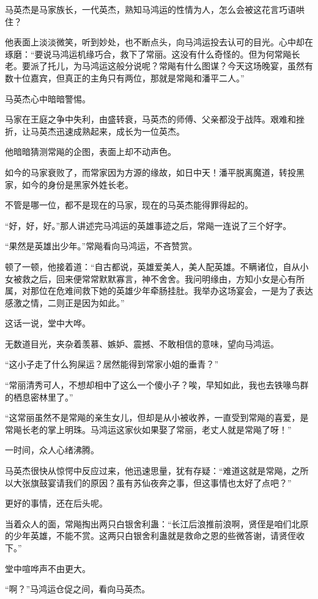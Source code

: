 \begin{this_body}
马英杰是马家族长，一代英杰，熟知马鸿运的性情为人，怎么会被这花言巧语哄住？

他表面上淡淡微笑，听到妙处，也不断点头，向马鸿运投去认可的目光。心中却在琢磨：“要说马鸿运机缘巧合，救下了常丽。这没有什么奇怪的。但为何常飚长老。要派了托儿，为马鸿运这般分说呢？常飚有什么图谋？今天这场晚宴，虽然有数十位嘉宾，但真正的主角只有两位，那就是常飚和潘平二人。”

马英杰心中暗暗警惕。

马家在王庭之争中失利，由盛转衰，马英杰的师傅、父亲都没于战阵。艰难和挫折，让马英杰迅速成熟起来，成长为一位英杰。

他暗暗猜测常飚的企图，表面上却不动声色。

如今的马家衰败了，而常家因为方源的缘故，如日中天！潘平脱离魔道，转投黑家，如今的身份是黑家外姓长老。

不管是哪一位，都不是现在的马家，现在的马英杰能得罪得起的。

“好，好，好。”那人讲述完马鸿运的英雄事迹之后，常飚一连说了三个好字。

“果然是英雄出少年。”常飚看向马鸿运，不吝赞赏。

顿了一顿，他接着道：“自古都说，英雄爱美人，美人配英雄。不瞒诸位，自从小女被救之后，回来便常常默默寡言，神不舍舍。我问明缘由，方知小女是心有所属，对那位在危难间救下她的英雄少年牵肠挂肚。我举办这场宴会，一是为了表达感激之情，二则正是因为如此。”

这话一说，堂中大哗。

无数道目光，夹杂着羡慕、嫉妒、震撼、不敢相信的意味，望向马鸿运。

“这小子走了什么狗屎运？居然能得到常家小姐的垂青？”

“常丽清秀可人，不想却相中了这么一个傻小子？唉，早知如此，我也去铁喙鸟群的栖息密林里了。”

“这常丽虽然不是常飚的亲生女儿，但却是从小被收养，一直受到常飚的喜爱，是常飚长老的掌上明珠。马鸿运这家伙如果娶了常丽，老丈人就是常飚了呀！”

一时间，众人心绪沸腾。

马英杰很快从惊愕中反应过来，他迅速思量，犹有存疑：“难道这就是常飚，之所以大张旗鼓宴请我们的原因？虽有苏仙夜奔之事，但这事情也太好了点吧？”

更好的事情，还在后头呢。

当着众人的面，常飚掏出两只白银舍利蛊：“长江后浪推前浪啊，贤侄是咱们北原的少年英雄，不能不赏。这两只白银舍利蛊就是救命之恩的些微答谢，请贤侄收下。”

堂中喧哗声不由更大。

“啊？”马鸿运仓促之间，看向马英杰。


\end{this_body}
